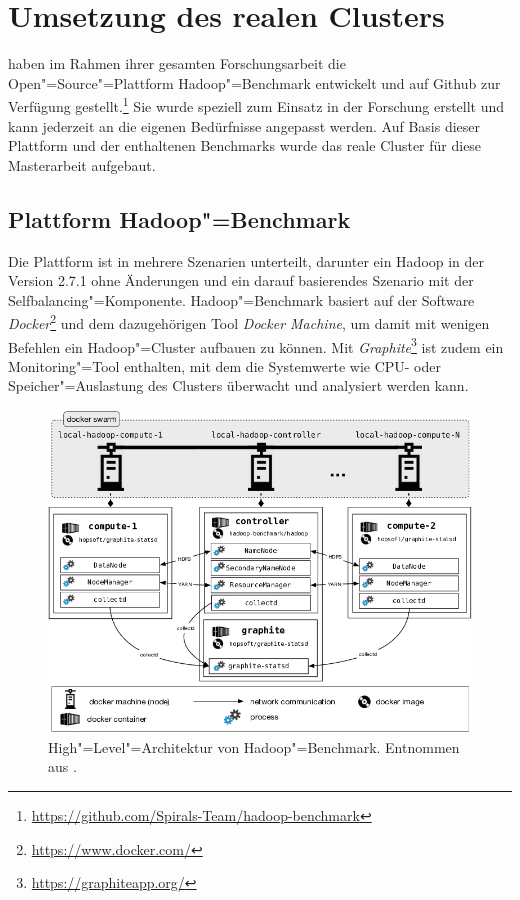 \section{Umsetzung des realen Clusters}\label{sec:aufbauCluster}

\citeauthor{zhang2016} haben im Rahmen ihrer gesamten Forschungsarbeit die Open"=Source"=Plattform Hadoop"=Benchmark entwickelt und auf Github zur Verfügung gestellt.\footnote{\url{https://github.com/Spirals-Team/hadoop-benchmark}}
Sie wurde speziell zum Einsatz in der Forschung erstellt und kann jederzeit an die eigenen Bedürfnisse angepasst werden.
Auf Basis dieser Plattform und der enthaltenen Benchmarks wurde das reale Cluster für diese Masterarbeit aufgebaut.

\subsection{Plattform Hadoop"=Benchmark}\label{sec:hadoopBenchmark}

Die Plattform ist in mehrere Szenarien unterteilt, darunter ein Hadoop in der Version 2.7.1 ohne Änderungen und ein darauf basierendes Szenario mit der Selfbalancing"=Komponente.
Hadoop"=Benchmark basiert auf der Software \emph{Docker}\footnote{\url{https://www.docker.com/}} und dem dazugehörigen Tool \emph{Docker Machine}, um damit mit wenigen Befehlen ein Hadoop"=Cluster aufbauen zu können.
Mit \emph{Graphite}\footnote{\url{https://graphiteapp.org/}} ist zudem ein Monitoring"=Tool enthalten, mit dem die Systemwerte wie CPU- oder Speicher"=Auslastung des Clusters überwacht und analysiert werden kann.

\begin{figure}
    \includegraphics{./images/hadoopBenchmarkArch.png}
    \caption[High"=Level"=Architektur von Hadoop"=Benchmark]
    {High"=Level"=Architektur von Hadoop"=Benchmark.
        Entnommen aus \cite{abb:hadoopBenchmarkArch}.}
    \label{fig:hadoopBenchmarkArchitecture}
\end{figure}

